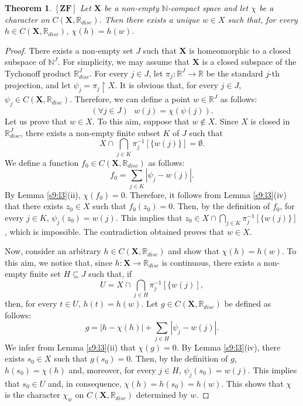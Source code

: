 \documentclass[12pt,twoside,leqno]{article}
\theoremstyle{plain}
\newtheorem{theorem}{Theorem}[section]
\theoremstyle{definition}
\theoremstyle{remark}
\begin{document}
\begin{theorem}
	\label{s9:t5}
	$[\mathbf{ZF}]$ Let $\mathbf{X}$ be a non-empty $\mathbb{N}$-compact space and let $\chi$ be a character on $C(\mathbf{X}, \mathbb{R}_{disc})$. Then there exists a unique $w\in X$ such that, for every $h\in C(\mathbf{X}, \mathbb{R}_{disc})$, $\chi(h)=h(w)$. 
\end{theorem}
\begin{proof}
	There exists a non-empty set $J$ such that $\mathbf{X}$ is homeomorphic to a closed subspace of $\mathbb{N}^J$. For simplicity, we may assume that $\mathbf{X}$ is a closed subspace of the Tychonoff product $\mathbb{R}_{disc}^J$. For every $j\in J$, let $\pi_j: \mathbb{R}^J\to \mathbb{R}$ be the standard $j$-th projection, and let $\psi_j=\pi_j\upharpoonright X$. It is obvious that, for every $j\in J$, $\psi_j\in C(\mathbf{X}, \mathbb{R}_{disc})$. Therefore, we can define a point $w\in\mathbb{R}^J$ as follows:
	$$(\forall j\in J)\text{ } w(j)=\chi(\psi(j)).$$
	Let us prove that $w\in X$. To this aim, suppose that $w\notin X$. Since $X$ is closed in $\mathbb{R}_{disc}^J$, there exists a non-empty finite subset $K$ of $J$ such that 
	$$ X\cap \bigcap\limits_{j\in K}\pi_j^{-1}[\{w(j)\}]=\emptyset.$$
	We define a function $f_0\in C(\mathbf{X}, \mathbb{R}_{disc})$ as follows:
	$$f_0=\sum\limits_{j\in K}|\psi_j-w(j)|.$$
	By Lemma \ref{s9:l3}(ii), $\chi(f_0)=0$. Therefore, it follows from Lemma \ref{s9:l3}(iv) that there exists $z_0\in X$ such that $f_0(z_0)=0$. Then, by the definition of $f_0$, for every $j\in K$, $\psi_j(z_0)=w(j)$. This implies that $z_0\in X\cap \bigcap\limits_{j\in K}\pi_j^{-1}[\{w(j)\}]$, which is impossible. The contradiction obtained proves that $w\in X$. 
	
	Now, consider an arbitrary  $h\in C(\mathbf{X},\mathbb{R}_{disc})$ and show that $\chi(h)=h(w)$. To this aim, we notice that, since $h:\mathbf{X}\to\mathbb{R}_{disc}$ is continuous, there exists a non-empty finite set $H\subseteq J$ such that, if
	$$U=X\cap\bigcap\limits_{j\in H}\pi_j^{-1}[\{w(j)],$$
	then, for every $t\in U$, $h(t)=h(w)$. Let $g\in C(\mathbf{X}, \mathbb{R}_{disc})$ be defined as follows:
	$$ g= |h-\chi(h)|+\sum\limits_{j\in H}|\psi_j-w(j)|.$$
	We infer from Lemma \ref{s9:l3}(ii) that $\chi(g)=0$. By Lemma \ref{s9:l3}(iv), there exists $s_0\in X$ such that $g(s_0)=0$. Then, by the definition of $g$, $h(s_0)=\chi(h)$ and, moreover, for every $j\in H$, $\psi_j(s_0)=w(j)$. This implies that $s_0\in U$ and, in consequence, $\chi(h)=h(s_0)=h(w)$. This shows that $\chi$ is the character $\chi_w$ on $C(\mathbf{X}, \mathbb{R}_{disc})$ determined by $w$. 
	

\end{proof}
\end{document}
